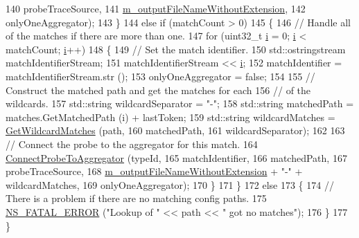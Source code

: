 \begin{DoxyCode}
140                                 probeTraceSource,
141                                 \hyperlink{classns3_1_1FileHelper_a65ce7e46c43b018fe5e648d179e7b52e}{m\_outputFileNameWithoutExtension},
142                                 onlyOneAggregator);
143     \}
144   \textcolor{keywordflow}{else} \textcolor{keywordflow}{if} (matchCount > 0)
145     \{
146       \textcolor{comment}{// Handle all of the matches if there are more than one.}
147       \textcolor{keywordflow}{for} (uint32\_t \hyperlink{bernuolliDistribution_8m_a6f6ccfcf58b31cb6412107d9d5281426}{i} = 0; \hyperlink{bernuolliDistribution_8m_a6f6ccfcf58b31cb6412107d9d5281426}{i} < matchCount; \hyperlink{bernuolliDistribution_8m_a6f6ccfcf58b31cb6412107d9d5281426}{i}++)
148         \{
149           \textcolor{comment}{// Set the match identifier.}
150           std::ostringstream matchIdentifierStream;
151           matchIdentifierStream << \hyperlink{bernuolliDistribution_8m_a6f6ccfcf58b31cb6412107d9d5281426}{i};
152           matchIdentifier = matchIdentifierStream.str ();
153           onlyOneAggregator = \textcolor{keyword}{false};
154 
155           \textcolor{comment}{// Construct the matched path and get the matches for each}
156           \textcolor{comment}{// of the wildcards.}
157           std::string wildcardSeparator = \textcolor{stringliteral}{"-"};
158           std::string matchedPath = matches.GetMatchedPath (i) + lastToken;
159           std::string wildcardMatches = \hyperlink{namespacens3_ab2d3424cd46a0cf26722b70079835354}{GetWildcardMatches} (path,
160                                                             matchedPath,
161                                                             wildcardSeparator);
162 
163           \textcolor{comment}{// Connect the probe to the aggregator for this match.}
164           \hyperlink{classns3_1_1FileHelper_af67443ae87a58eeaa0536b38e9349a07}{ConnectProbeToAggregator} (typeId,
165                                     matchIdentifier,
166                                     matchedPath,
167                                     probeTraceSource,
168                                     \hyperlink{classns3_1_1FileHelper_a65ce7e46c43b018fe5e648d179e7b52e}{m\_outputFileNameWithoutExtension} + \textcolor{stringliteral}{"-"} 
      + wildcardMatches,
169                                     onlyOneAggregator);
170         \}
171     \}
172   \textcolor{keywordflow}{else}
173     \{
174       \textcolor{comment}{// There is a problem if there are no matching config paths.}
175       \hyperlink{group__fatal_ga5131d5e3f75d7d4cbfd706ac456fdc85}{NS\_FATAL\_ERROR} (\textcolor{stringliteral}{"Lookup of "} << path << \textcolor{stringliteral}{" got no matches"});
176     \}
177 \}
\end{DoxyCode}


